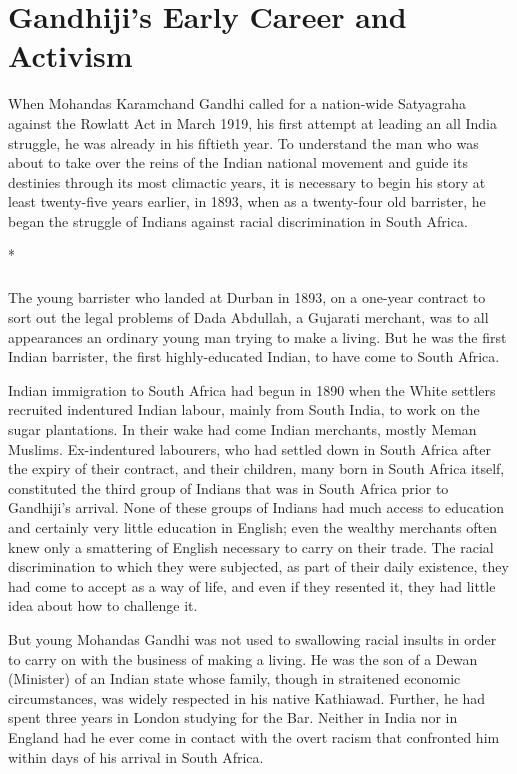 \chapter{Gandhiji's Early Career and Activism}
\begin{multicols}{2}

When Mohandas Karamchand Gandhi called for a nation-wide Satyagraha against the Rowlatt Act in March 1919, his first attempt at leading an all India struggle, he was already in his fiftieth year. To understand the man who was about to take over the reins of the Indian national movement and guide its destinies through its most climactic years, it is necessary to begin his story at least twenty-five years earlier, in 1893, when as a twenty-four old barrister, he began the struggle of Indians against racial discrimination in South Africa.

\begin{center}*\end{center}

\paragraph*{}

The young barrister who landed at Durban in 1893, on a one-year contract to sort out the legal problems of Dada Abdullah, a Gujarati merchant, was to all appearances an ordinary young man trying to make a living. But he was the first Indian barrister, the first highly-educated Indian, to have come to South Africa.

Indian immigration to South Africa had begun in 1890 when the White settlers recruited indentured Indian labour, mainly from South India, to work on the sugar plantations. In their wake had come Indian merchants, mostly Meman Muslims. Ex-indentured labourers, who had settled down in South Africa after the expiry of their contract, and their children, many born in South Africa itself, constituted the third group of Indians that was in South Africa prior to Gandhiji's arrival. None of these groups of Indians had much access to education and certainly very little education in English; even the wealthy merchants often knew only a smattering of English necessary to carry on their trade. The racial discrimination to which they were subjected, as part of their daily existence, they had come to accept as a way of life, and even if they resented it, they had little idea about how to challenge it.

But young Mohandas Gandhi was not used to swallowing racial insults in order to carry on with the business of making a living. He was the son of a Dewan (Minister) of an Indian state whose family, though in straitened economic circumstances, was widely respected in his native Kathiawad. Further, he had spent three years in London studying for the Bar. Neither in India nor in England had he ever come in contact with the overt racism that confronted him within days of his arrival in South Africa.


\end{multicols}
